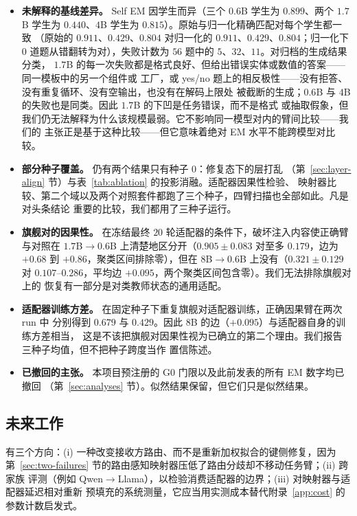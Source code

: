 \documentclass[11pt]{article}
\begin{document}
\begin{itemize}
  我们对该残差做了归因而非任其不明——重复捕获、缓存往返与显式位置偏移都是精确的，全部差异
  都属于注意力内核路径，是 bf16 精度下的数值差异而不是实现缺陷。旧数字作为对照列在补充
  材料中，而不放在正文。
\item \textbf{未解释的基线差异。} Self EM 因学生而异（三个 $0.6$B 学生为 $0.899$、两个
  $1.7$B 学生为 $0.440$、$4$B 学生为 $0.815$）。原始与归一化精确匹配对每个学生都一致
  （原始的 $0.911$、$0.429$、$0.804$ 对归一化的 $0.911$、$0.429$、$0.804$；归一化下
  $0$ 道题从错翻转为对），失败计数为 $56$ 题中的 $5$、$32$、$11$。对归档的生成结果分类，
  $1.7$B 的每一次失败都是格式良好、但给出错误实体或数值的答案——同一模板中的另一个组件或
  工厂，或 yes/no 题上的相反极性——没有拒答、没有重复循环、没有空输出，也没有在解码上限处
  被截断的生成；$0.6$B 与 $4$B 的失败也是同类。因此 $1.7$B 的下凹是任务错误，而不是格式
  或抽取假象，但我们仍无法解释为什么该规模最弱。它不影响同一模型对内的臂间比较——我们的
  主张正是基于这种比较——但它意味着绝对 EM 水平不能跨模型对比较。
\item \textbf{部分种子覆盖。} 仍有两个结果只有种子 0：修复态下的层打乱
  （第~\ref{sec:layer-align} 节）与表~\ref{tab:ablation} 的投影消融。适配器因果性检验、
  映射器比较、第二个域以及两个对照套件都跑了三个种子，四臂扫描也全部如此。凡是对头条结论
  重要的比较，我们都用了三种子运行。
\item \textbf{旗舰对的因果性。} 在冻结最终 $20$ 轮适配器的条件下，破坏注入内容使正确臂
  与对照在 $1.7$B$\to0.6$B 上清楚地区分开（$0.905\pm0.083$ 对至多 $0.179$，边为
  $+0.68$ 到 $+0.86$，聚类区间排除零），但在 $8$B$\to0.6$B 上没有（$0.321\pm0.129$
  对 $0.107$--$0.286$，平均边 $+0.095$，两个聚类区间包含零）。我们无法排除旗舰对上的
  恢复有一部分是对类教师状态的通用适配。
\item \textbf{适配器训练方差。} 在固定种子下重复旗舰对适配器训练，正确因果臂在两次 run 中
  分别得到 $0.679$ 与 $0.429$。因此 $8$B 的边（$+0.095$）与适配器自身的训练方差相当，
  这是不该把旗舰对因果性视为已确立的第二个理由。我们报告三种子均值，但不把种子跨度当作
  置信陈述。
\item \textbf{已撤回的主张。} 本项目预注册的 G0 门限以及此前发表的所有 EM 数字均已撤回
  （第~\ref{sec:analyses} 节）。似然结果保留，但它们只是似然结果。
\end{itemize}

\subsection{未来工作}
\label{sec:future-work}
有三个方向：(i) 一种改变接收方路由、而不是重新加权拟合的键侧修复，因为
第~\ref{sec:two-failures} 节的路由感知映射器压低了路由分歧却不移动任务臂；(ii) 跨家族
评测（例如 Qwen$\to$Llama），以检验消费适配器的边界；(iii) 对映射器与适配器延迟相对重新
预填充的系统测量，它应当用实测成本替代附录~\ref{app:cost} 的参数计数启发式。
\end{document}
